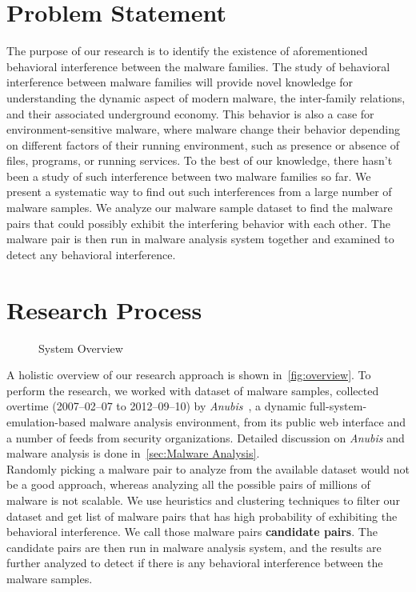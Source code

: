\section{Problem Statement}
\label{sec:Problem Statement}
The purpose of our research is to identify the existence of aforementioned behavioral interference between the malware families.
The study of behavioral interference between malware families will provide novel knowledge for understanding the dynamic aspect of modern malware, the inter-family relations, and their associated underground economy.
This behavior is also a case for environment-sensitive malware, where malware change their behavior depending on different factors of their running environment, such as presence or absence of files, programs, or running services.
To the best of our knowledge, there hasn't been a study of such interference between two malware families so far.
We present a systematic way to find out such interferences from a large number of malware samples.
We analyze our malware sample dataset to find the malware pairs that could possibly exhibit the interfering behavior with each other.
The malware pair is then run in malware analysis system together and examined to detect any behavioral interference.
\section{Research Process}
\label{sec:Research Process}

\begin{figure}[h]
    \centering
    \def\svgwidth{\columnwidth}
    \scalebox{0.7}{}
\caption{System Overview}
\label{fig:overview}
\end{figure}

A holistic overview of our research approach is shown in~\autoref{fig:overview}.
To perform the research, we worked with dataset of {\gettotalmalwarei{}} malware samples, collected overtime (2007--02--07 to 2012--09--10) by \emph{Anubis}~\cite[]{anubis}, a dynamic full-system-emulation-based malware analysis environment, from its public web interface and a number of feeds from security organizations.
Detailed discussion on \emph{Anubis} and malware analysis is done in~\autoref{sec:Malware Analysis}.\\

Randomly picking a malware pair to analyze from the available dataset would not be a good approach, whereas analyzing all the possible pairs of millions of malware is not scalable.
We use heuristics and clustering techniques to filter our dataset and get list of malware pairs that has high probability of exhibiting the behavioral interference.
We call those malware pairs \textbf{candidate pairs}.
The candidate pairs are then run in malware analysis system, and the results are further analyzed to detect if there is any behavioral interference between the malware samples.\\

